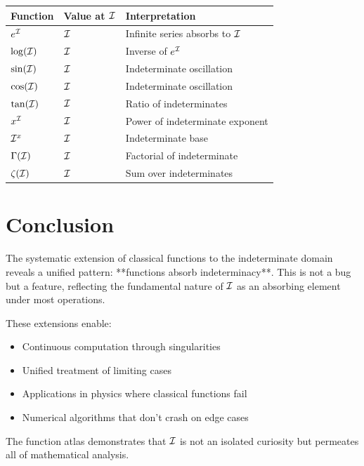 \begin{center}
\begin{tabular}{|l|l|l|}
\hline
\textbf{Function} & \textbf{Value at $\mathcal{I}$} & \textbf{Interpretation} \\
\hline
$e^{\mathcal{I}}$ & $\mathcal{I}$ & Infinite series absorbs to $\mathcal{I}$ \\
$\log(\mathcal{I})$ & $\mathcal{I}$ & Inverse of $e^{\mathcal{I}}$ \\
$\sin(\mathcal{I})$ & $\mathcal{I}$ & Indeterminate oscillation \\
$\cos(\mathcal{I})$ & $\mathcal{I}$ & Indeterminate oscillation \\
$\tan(\mathcal{I})$ & $\mathcal{I}$ & Ratio of indeterminates \\
$x^{\mathcal{I}}$ & $\mathcal{I}$ & Power of indeterminate exponent \\
$\mathcal{I}^x$ & $\mathcal{I}$ & Indeterminate base \\
$\Gamma(\mathcal{I})$ & $\mathcal{I}$ & Factorial of indeterminate \\
$\zeta(\mathcal{I})$ & $\mathcal{I}$ & Sum over indeterminates \\
\hline
\end{tabular}
\end{center}

\section*{Conclusion}

The systematic extension of classical functions to the indeterminate domain reveals a unified pattern: **functions absorb indeterminacy**. This is not a bug but a feature, reflecting the fundamental nature of $\mathcal{I}$ as an absorbing element under most operations.

These extensions enable:
\begin{itemize}
    \item Continuous computation through singularities
    \item Unified treatment of limiting cases
    \item Applications in physics where classical functions fail
    \item Numerical algorithms that don't crash on edge cases
\end{itemize}

The function atlas demonstrates that $\mathcal{I}$ is not an isolated curiosity but permeates all of mathematical analysis.
